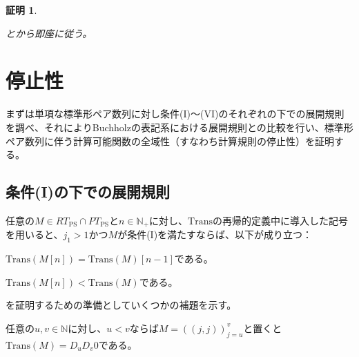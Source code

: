 \documentclass[dvipdfmx,uplatex]{jsarticle}
\theoremstyle{customnonumberbreakfortheorem}
\theoremstyle{customnonumberbreakforproof}
\newtheorem{hideableproof}{証明}
\begin{document}
\begin{hideableproof}
	\begin{indented}
		\item {}とから即座に従う。
	\end{indented}
\end{hideableproof}


\section{停止性}

まずは単項な標準形ペア数列に対し条件(I)～(VI)のそれぞれの下での展開規則を調べ、それによりBuchholzの表記系における展開規則との比較を行い、標準形ペア数列に伴う計算可能関数の全域性（すなわち計算規則の停止性）を証明する。


\subsection{条件(I)の下での展開規則}

\begin{proposition}\label{条件(I)の下でのTransと基本列の交換関係}
	任意の\(M \in RT_{\textrm{PS}} \cap PT_{\textrm{PS}}\)と\(n \in \mathbb{N}_{+}\)に対し、\(\textrm{Trans}\)の再帰的定義中に導入した記号を用いると、\(j_1 > 1\)かつ\(M\)が条件(I)を満たすならば\footnotemark{}、以下が成り立つ：
	\begin{penumerate}
		\item \(\textrm{Trans}(M[n]) = \textrm{Trans}(M)[n-1]\)である。
		\item \(\textrm{Trans}(M[n]) < \textrm{Trans}(M)\)である。
	\end{penumerate}
\end{proposition}

を証明するための準備としていくつかの補題を示す。

\begin{lemma}\label{公差(1,1)のペア数列のTransの基本性質}
	任意の\(u,v \in \mathbb{N}\)に対し、\(u < v\)ならば\(M = ((j,j))_{j=u}^{v}\)と置くと\(\textrm{Trans}(M) = D_u D_v 0\)である。
\end{lemma}
\end{document}
